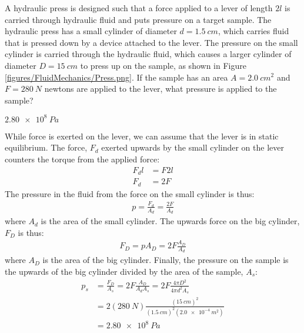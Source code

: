 \question A hydraulic press is designed such that a force applied to a lever of length $2l$ is carried through hydraulic fluid and puts pressure on a target sample. The hydraulic press has a small cylinder of diameter $d = \SI{1.5}{cm}$, which carries fluid that is pressed down by a device attached to the lever. The pressure on the small cylinder is carried through the hydraulic fluid, which causes a larger cylinder of diameter $D = \SI{15}{cm}$ to press up on the sample, as shown in Figure \ref{figures/FluidMechanics/Press.png}. If the sample has an area $A = \SI{2.0}{cm^2}$ and $F = \SI{280}{N}$ newtons are applied to the lever, what pressure is applied to the sample?
\begin{finalanswer}
	$\SI{2.80e8}{Pa}$
\end{finalanswer}
\begin{solution}
	While force is exerted on the lever, we can assume that the lever is in static equilibrium. The force, $F_d$ exerted upwards by the small cylinder on the lever counters the torque from the applied force:
	\begin{align*}
	F_dl&=F2l\\
	F_d&=2F
	\end{align*}
	The pressure in the fluid from the force on the small cylinder is thus:
	\begin{align*}
	p=\frac{F_d}{A_d}=\frac{2F}{A_d}
	\end{align*}
	where $A_d$ is the area of the small cylinder. The upwards force on the big cylinder, $F_D$ is thus:
	\begin{align*}
	F_D=pA_D=2F\frac{A_D}{A_d}
	\end{align*}
	where $A_D$ is the area of the big cylinder. Finally, the pressure on the sample is the upwards of the big cylinder divided by the area of the sample, $A_s$:
	\begin{align*}
	p_s&=\frac{F_D}{A_s}=2F\frac{A_D}{A_dA_s}=2F\frac{4\pi D^2}{4\pi d^2A_s}\\
	&=2(\SI{280}{N})\frac{(\SI{15}{cm})^2}{(\SI{1.5}{cm})^2(\SI{2.0e-4}{m^2})}\\
	&=\SI{2.80e8}{Pa}
	\end{align*}
\end{solution}

